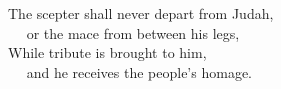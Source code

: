
\lettrine{T}{}he scepter shall never depart from Judah,\\
   or the mace from between his legs,\\
While tribute is brought to him,\\
   and he receives the people’s homage.